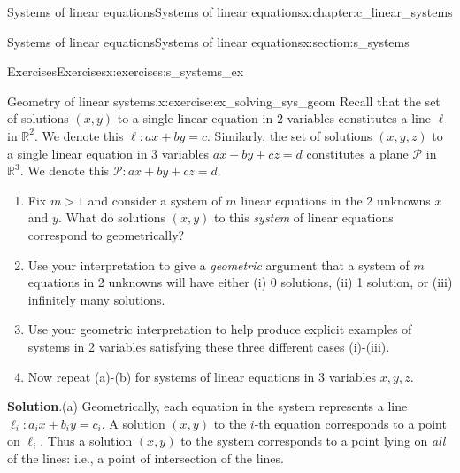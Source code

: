 \documentclass[oneside,10pt,]{book}
\newcommand{\blocktitlefont}{\relax}
\numberwithin{equation}{section}
\newcommand{\R}{{\mathbb R}}
\begin{document}
\begin{chapterptx}{Systems of linear equations}{}{Systems of linear equations}{}{}{x:chapter:c_linear_systems}
%
%
\typeout{************************************************}
\typeout{************************************************}
%
\begin{sectionptx}{Systems of linear equations}{}{Systems of linear equations}{}{}{x:section:s_systems}
%
%
\typeout{************************************************}
\typeout{************************************************}
%
\begin{exercises-subsection-numberless}{Exercises}{}{Exercises}{}{}{x:exercises:s_systems_ex}
\begin{divisionexercise}{1}{Geometry of linear systems.}{}{x:exercise:ex_solving_sys_geom}%
Recall that the set of solutions \((x,y)\) to a single linear equation in 2 variables constitutes a line \(\ell\) in \(\R^2\). We denote this \(\ell\colon ax+by=c\). Similarly, the set of solutions \((x,y,z)\) to a single linear equation in 3 variables \(ax+by+cz=d\) constitutes a plane \(\mathcal{P}\) in \(\R^3\). We denote this \(\mathcal{P}\colon ax+by+cz=d\).%
%
\begin{enumerate}[marker=(\alph*)]
\item{}Fix \(m>1\) and consider a system of \(m\) linear equations in the 2 unknowns \(x\) and \(y\). What do solutions \((x,y)\) to this \emph{system} of linear equations correspond to geometrically?%
\item{}Use your interpretation to give a \emph{geometric} argument that a system of \(m\) equations in 2 unknowns will have either (i) 0 solutions, (ii) 1 solution, or (iii) infinitely many solutions.%
\item{}Use your geometric interpretation to help produce explicit examples of systems in 2 variables satisfying these three different cases (i)-(iii).%
\item{}Now repeat (a)-(b) for systems of linear equations in 3 variables \(x,y, z\).%
\end{enumerate}
\par\smallskip%
\noindent\textbf{\blocktitlefont Solution}.\hypertarget{g:solution:idm437161211920}{}\quad{}(a) Geometrically, each equation in the system represents a line \(\ell_i\colon a_ix+b_iy=c_i\). A solution \((x,y)\) to the \(i\)-th equation corresponds to a point on \(\ell_i\). Thus a solution \((x,y)\) to the system corresponds to a point lying on \emph{all} of the lines: i.e., a point of intersection of the lines.%

\end{divisionexercise}
\end{exercises-subsection-numberless}
\end{sectionptx}
\end{chapterptx}
\end{document}
